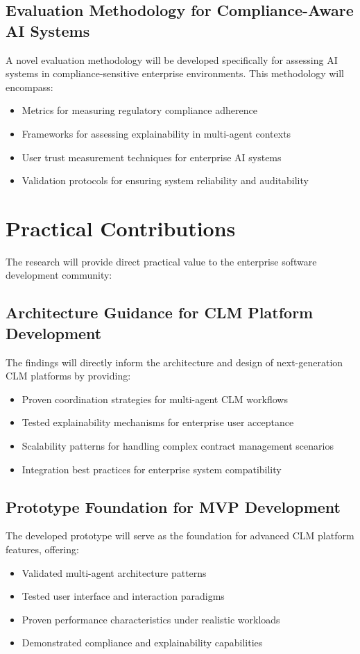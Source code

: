 \subsection{Evaluation Methodology for Compliance-Aware AI Systems}
A novel evaluation methodology will be developed specifically for assessing AI systems in compliance-sensitive enterprise environments. This methodology will encompass:
\begin{itemize}
    \item Metrics for measuring regulatory compliance adherence
    \item Frameworks for assessing explainability in multi-agent contexts
    \item User trust measurement techniques for enterprise AI systems
    \item Validation protocols for ensuring system reliability and auditability
\end{itemize}

\section{Practical Contributions}

The research will provide direct practical value to the enterprise software development community:

\subsection{Architecture Guidance for CLM Platform Development}
The findings will directly inform the architecture and design of next-generation CLM platforms by providing:
\begin{itemize}
    \item Proven coordination strategies for multi-agent CLM workflows
    \item Tested explainability mechanisms for enterprise user acceptance
    \item Scalability patterns for handling complex contract management scenarios
    \item Integration best practices for enterprise system compatibility
\end{itemize}

\subsection{Prototype Foundation for MVP Development}
The developed prototype will serve as the foundation for advanced CLM platform features, offering:
\begin{itemize}
    \item Validated multi-agent architecture patterns
    \item Tested user interface and interaction paradigms
    \item Proven performance characteristics under realistic workloads
    \item Demonstrated compliance and explainability capabilities
\end{itemize}

